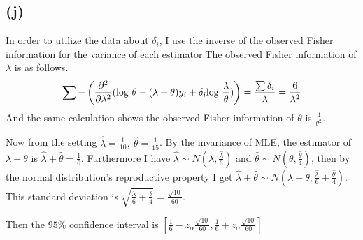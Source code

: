 \documentclass{article}
\begin{document}
\subsection{(j)}
In order to utilize the data about $\delta_i$, I use the inverse of the observed Fisher information for the variance of each estimator.The observed Fisher information of $\lambda$ is as follows.
\begin{align*}
	\sum -\left( \frac{\partial^2}{\partial \lambda^2} ({\rm log}\ \theta - (\lambda+\theta) y_i + \delta_i {\rm log}\ \frac{\lambda}{\theta}) \right) = \frac{\sum \delta_i}{\lambda} = \frac{6}{\lambda^2}
\end{align*}
And the same calculation shows the observed Fisher information of $\theta$ is $\frac{4}{\theta^2}$.
\par
Now from the setting $\hat{\lambda} = \frac{1}{10}, \ \hat{\theta} = \frac{1}{15}$. By the invariance of MLE, the estimator of $\lambda + \theta$ is $\hat{\lambda}+ \hat{\theta} = \frac{1}{6}$. Furthermore I have $\hat{\lambda} \sim N(\lambda, \frac{\hat{\lambda}}{6})$ and $\hat{\theta} \sim N(\theta, \frac{\hat{\theta}}{4})$, then by the normal distribution's reproductive property I get $\hat{\lambda}+ \hat{\theta} \sim N(\lambda+\theta, \frac{\hat{\lambda}}{6}+\frac{\hat{\theta}}{4})$. This standard deviation is $\sqrt{\frac{\hat{\lambda}}{6}+\frac{\hat{\theta}}{4}} = \frac{\sqrt{10}}{60}$.
\par
Then the $95\%$ confidence interval is $[\frac{1}{6} - z_{\alpha} \frac{\sqrt{10}}{60}, \frac{1}{6} + z_{\alpha} \frac{\sqrt{10}}{60}]$ 
\end{document}
